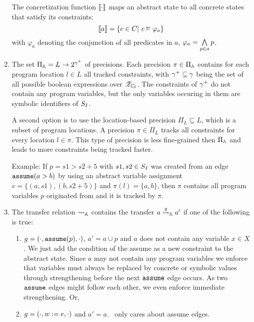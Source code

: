 \begin{enumerate}[leftmargin=*,label=\arabic*.]
	The concretization function $\llbracket \cdot \rrbracket$ maps an abstract state to all concrete states that satisfy its constraints:
	\[ \llbracket a \rrbracket = \{ c \in C |\ c \vDash \varphi_a \} \]
	with $\varphi_a$ denoting the conjunction of all predicates in $a$, $\varphi_a = \bigwedge\limits_{p \in a} p$.

\item
The set $\Pi_{\mathbb{A}} = L \rightarrow 2^{{\gamma^+}}$ of precisions. Each precision $\pi \in \Pi_{\mathbb{A}}$ contains for each program location $l \in L$ all tracked constraints, with ${\gamma^+} \subseteq \gamma$ being the set of all possible boolean expressions over ${\mathscr{Z}_{\mathbb{C_{S}}}}$.
The constraints of ${\gamma^+}$ do not contain any program variables, but the only variables occuring in them are symbolic identifiers of $S_I$.

A second option is to use the location-based precision $\Pi_L \subseteq L$, which is a subset of program locations.
A precision $\pi \in \Pi_L$ tracks all constraints for every location $l \in \pi$.
This type of precision is less fine-grained then $\Pi_{\mathbb{A}}$ and leads to more constraints being tracked faster.

Example: If $p = s1 > s2 + 5$ with $s1, s2 \in S_I$ was created from an edge $\texttt{assume}(a > b)$ by using an abstract variable assignment $v = \{ (a, s1), (b, s2 + 5) \}$
and $\pi(l) = \{ a, b \}$, then $\pi$ contains all program variables $p$ originated from and it is tracked by $\pi$. 

\item The transfer relation $\rightsquigarrow_{\mathbb{A}}$ contains the transfer $a \overset{g}{\rightsquigarrow}_{\mathbb{A}} a'$ if one of the following is true:
	\begin{enumerate}[label=\alph*)]
		\item $g = (\cdot, \texttt{assume}(p), \cdot)$, $a' = a \cup p$ and
			$a$ does not contain any variable $x \in X$.
			We just add the condition of the assume as a new constraint to the abstract state.
			Since $a$ may not contain any program variables we enforce that
			variables must always be replaced by concrete or symbolic values through strengthening before the next $\texttt{assume}$ edge occurs.
			As two $\texttt{assume}$ edges might follow each other, we even enforce immediate strengthening.
			Or,
		\item $g = (\cdot, w := e, \cdot)$ and $a' = a$. \ConstraintsCPA\ only cares about assume edges.
	\end{enumerate}
	

\end{enumerate}
